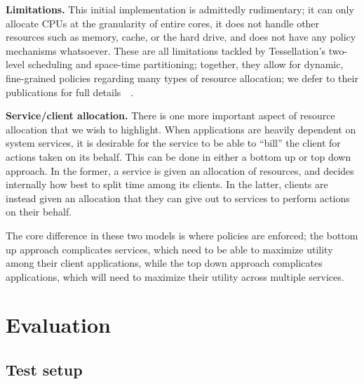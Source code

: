 \documentclass[letterpaper,twocolumn,11pt]{article}
\begin{document}
\textbf{Limitations.} This initial implementation is admittedly rudimentary; it can only allocate CPUs at the granularity of entire cores, it does not handle other resources such as memory, cache, or the hard drive, and does not have any policy mechanisms whatsoever. These are all limitations tackled by Tessellation's two-level scheduling and space-time partitioning; together, they allow for dynamic, fine-grained policies regarding many types of resource allocation; we defer to their publications for full details~\cite{liu09tessellation}~\cite{tessellation-hotpar10}.

\textbf{Service/client allocation.} There is one more important aspect of resource allocation that we wish to highlight. When applications are heavily dependent on system services, it is desirable for the service to be able to ``bill'' the client for actions taken on its behalf. This can be done in either a bottom up or top down approach. In the former, a service is given an allocation of resources, and decides internally how best to split time among its clients. In the latter, clients are instead given an allocation that they can give out to services to perform actions on their behalf.

The core difference in these two models is where policies are enforced; the bottom up approach complicates services, which need to be able to maximize utility among their client applications, while the top down approach complicates applications, which will need to maximize their utility across multiple services.

\section{Evaluation}

\subsection{Test setup}
\end{document}

